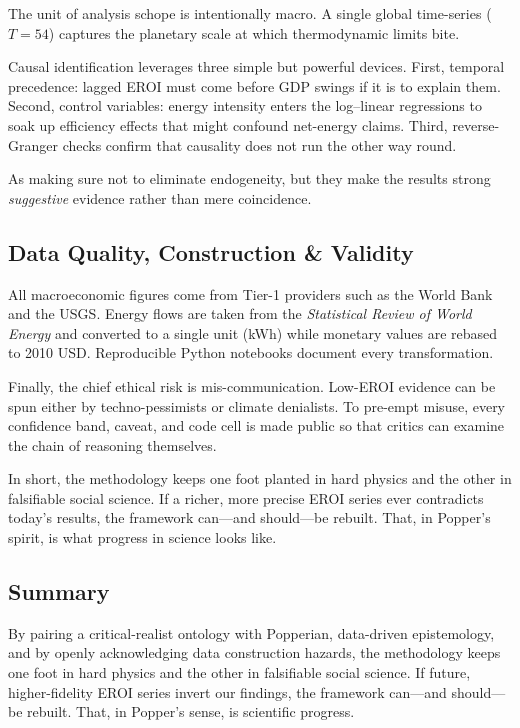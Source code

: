 \documentclass[a4paper,12pt]{article}
\begin{document}
The unit of analysis schope is intentionally macro.  A single global time-series
(\(T\!=\!54\)) captures the planetary scale at which thermodynamic limits bite.

Causal identification leverages three simple but powerful devices.  
First, temporal precedence: lagged EROI must come before GDP swings if it is to explain them.
Second, control variables: energy intensity enters the log–linear regressions to soak up
efficiency effects that might confound net-energy claims.  Third, reverse-Granger
checks confirm that causality does not run the other way round.  

As making sure not to eliminate endogeneity, but they make the results strong
\emph{suggestive} evidence rather than mere coincidence.

\subsection{Data Quality, Construction \& Validity}
\label{sec:data_quality}
All macroeconomic figures come from Tier-1 providers such as the World Bank and the
USGS.  Energy flows are taken from the \emph{Statistical Review of World Energy} and converted to a single unit (kWh) while monetary values are rebased to 2010 USD.  Reproducible Python notebooks document every transformation.

Finally, the chief ethical risk is mis-communication.  
Low-EROI evidence can be spun either by techno-pessimists or climate
denialists.  To pre-empt misuse, every confidence band, caveat, and code cell
is made public so that critics can examine the chain of reasoning themselves.

\bigskip
In short, the methodology keeps one foot planted in hard physics and the
other in falsifiable social science.  If a richer, more precise EROI series
ever contradicts today’s results, the framework can—and should—be rebuilt.
That, in Popper’s spirit, is what progress in science looks like.%
\subsection{Summary}
\label{sec:method_summary}
By pairing a critical-realist ontology with Popperian, data-driven
epistemology, and by openly acknowledging data construction hazards, the
methodology keeps one foot in hard physics and the other in falsifiable social
science.  If future, higher-fidelity EROI series invert our findings, the
framework can—and should—be rebuilt.  That, in Popper’s sense, is scientific
progress.
\newpage
\end{document}

